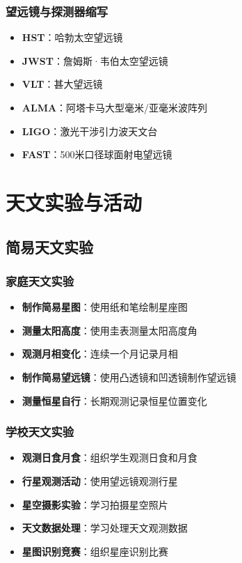 \documentclass[12pt,UTF8]{ctexbook}
\begin{document}
\section{望远镜与探测器缩写}

\begin{itemize}
  \item \textbf{HST}：哈勃太空望远镜
  \item \textbf{JWST}：詹姆斯·韦伯太空望远镜
  \item \textbf{VLT}：甚大望远镜
  \item \textbf{ALMA}：阿塔卡马大型毫米/亚毫米波阵列
  \item \textbf{LIGO}：激光干涉引力波天文台
  \item \textbf{FAST}：500米口径球面射电望远镜
\end{itemize}

\part{天文实验与活动}

\chapter{简易天文实验}
\section{家庭天文实验}

\begin{itemize}
  \item \textbf{制作简易星图}：使用纸和笔绘制星座图
  \item \textbf{测量太阳高度}：使用圭表测量太阳高度角
  \item \textbf{观测月相变化}：连续一个月记录月相
  \item \textbf{制作简易望远镜}：使用凸透镜和凹透镜制作望远镜
  \item \textbf{测量恒星自行}：长期观测记录恒星位置变化
\end{itemize}

\section{学校天文实验}

\begin{itemize}
  \item \textbf{观测日食月食}：组织学生观测日食和月食
  \item \textbf{行星观测活动}：使用望远镜观测行星
  \item \textbf{星空摄影实验}：学习拍摄星空照片
  \item \textbf{天文数据处理}：学习处理天文观测数据
  \item \textbf{星图识别竞赛}：组织星座识别比赛
\end{itemize}
\end{document}
